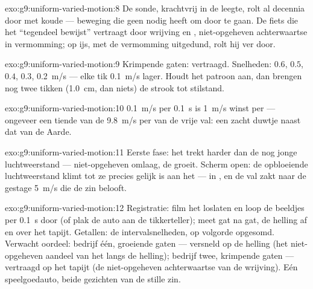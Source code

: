 \begin{solution}{exo:g9:uniform-varied-motion:8}
De sonde, krachtvrij in de leegte, rolt al decennia door met koude
 --- beweging die geen  nodig heeft om door te
gaan. De fiets die het ``tegendeel bewijst'' vertraagt door wrijving en
, niet-opgeheven achterwaartse  in
vermomming; op ijs, met de vermomming uitgedund, rolt hij ver door.
\end{solution}

\begin{solution}{exo:g9:uniform-varied-motion:9}
Krimpende gaten: vertraagd. Snelheden: $0.6$, $0.5$, $0.4$,
$0.3$, \qty{0.2}{m/s} --- elke tik \qty{0.1}{m/s} lager. Houdt het
patroon aan, dan brengen nog twee tikken (\qty{1.0}{cm}, dan niets) de
strook tot stilstand.
\end{solution}

\begin{solution}{exo:g9:uniform-varied-motion:10}
\qty{0.1}{m/s} per \qty{0.1}{s} is \qty{1}{m/s} winst per  ---
ongeveer een tiende van de \qty{9.8}{m/s} per  van de vrije val:
een zacht duwtje naast dat van de Aarde.
\end{solution}

\begin{solution}{exo:g9:uniform-varied-motion:11}
Eerste fase: het  trekt harder dan de nog jonge
luchtweerstand --- niet-opgeheven  omlaag, de
 groeit. Scherm open: de opbloeiende
luchtweerstand klimt tot ze precies gelijk is aan het
 ---  in , en de val
zakt naar de gestage \qty{5}{m/s} die de zin belooft.
\end{solution}

\begin{solution}{exo:g9:uniform-varied-motion:12}
Registratie: film het loslaten en loop de beeldjes per \qty{0.1}{s} door
(of plak de auto aan de tikkerteller); meet gat na gat, de
helling af en over het tapijt. Getallen: de intervalsnelheden, op
volgorde opgesomd. Verwacht oordeel: bedrijf één, groeiende gaten ---
versneld op de helling (het niet-opgeheven aandeel van het
 langs de helling); bedrijf twee, krimpende gaten ---
vertraagd op het tapijt (de niet-opgeheven achterwaartse
 van de wrijving). Eén speelgoedauto, beide gezichten van
de stille zin.
\end{solution}

